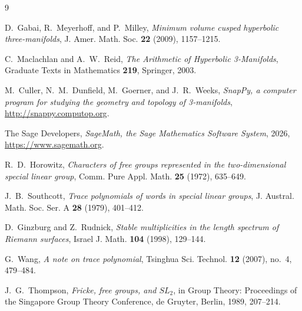 \documentclass[11pt,a4paper]{article}
\theoremstyle{definition}
\theoremstyle{remark}
\begin{document}
\begin{thebibliography}{9}

D.~Gabai, R.~Meyerhoff, and P.~Milley,
\emph{Minimum volume cusped hyperbolic three-manifolds},
J. Amer. Math. Soc. \textbf{22} (2009), 1157--1215.

C.~Maclachlan and A.~W.~Reid,
\emph{The Arithmetic of Hyperbolic 3-Manifolds},
Graduate Texts in Mathematics \textbf{219}, Springer, 2003.

M.~Culler, N.~M.~Dunfield, M.~Goerner, and J.~R.~Weeks,
\emph{SnapPy, a computer program for studying the geometry and
topology of 3-manifolds}, \url{http://snappy.computop.org}.

The Sage Developers,
\emph{SageMath, the Sage Mathematics Software System}, 2026,
\url{https://www.sagemath.org}.

R.~D.~Horowitz,
\emph{Characters of free groups represented in the two-dimensional
special linear group},
Comm. Pure Appl. Math. \textbf{25} (1972), 635--649.

J.~B.~Southcott,
\emph{Trace polynomials of words in special linear groups},
J. Austral. Math. Soc. Ser. A \textbf{28} (1979), 401--412.

D.~Ginzburg and Z.~Rudnick,
\emph{Stable multiplicities in the length spectrum of Riemann surfaces},
Israel J. Math. \textbf{104} (1998), 129--144.

G.~Wang,
\emph{A note on trace polynomial},
Tsinghua Sci. Technol. \textbf{12} (2007), no.~4, 479--484.

J.~G.~Thompson,
\emph{Fricke, free groups, and $SL_2$},
in Group Theory: Proceedings of the Singapore Group Theory Conference,
de Gruyter, Berlin, 1989, 207--214.

\end{thebibliography}
\end{document}
